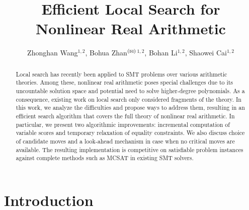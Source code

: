 \documentclass[runningheads]{llncs}
\begin{document}
%
\title{Efficient Local Search for Nonlinear Real Arithmetic}
%
%
\author{Zhonghan Wang\orcidA{}$^{1,2}$,
Bohua Zhan$^{\textrm{(\Letter)}}$\orcidB{}$^{1,2}$,
Bohan Li\orcidC{}$^{1,2}$,
Shaowei Cai\orcidD{}$^{1,2}$}
%
%
%
\maketitle              %
%
\begin{abstract}

Local search has recently been applied to SMT problems over various arithmetic theories. Among these, nonlinear real arithmetic poses special challenges due to its uncountable solution space and potential need to solve higher-degree polynomials. As a consequence, existing work on local search only considered fragments of the theory. In this work, we analyze the difficulties and propose ways to address them, resulting in an efficient search algorithm that covers the full theory of nonlinear real arithmetic. In particular, we present two algorithmic improvements: incremental computation of variable scores and temporary relaxation of equality constraints. We also discuss choice of candidate moves and a look-ahead mechanism in case when no critical moves are available. The resulting implementation is competitive on satisfiable problem instances against complete methods such as MCSAT in existing SMT solvers.  

\end{abstract}

\section{Introduction}
\end{document}
